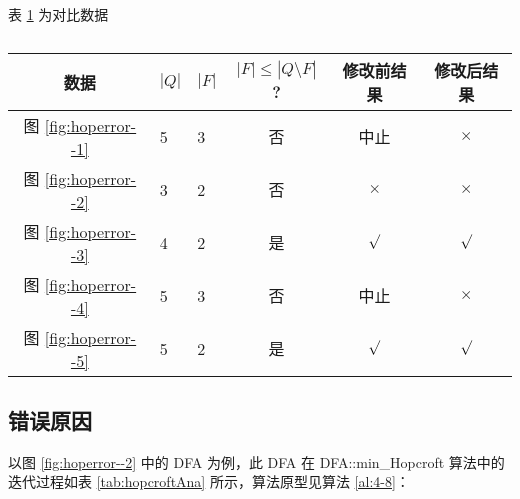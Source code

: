   表 \ref{tab:KeepMinResultofAll-hop} 为对比数据

  \begin{table}[!htbp]
    \caption{  }
    \label{tab:KeepMinResultofAll-hop}
    \centering
    \small%
    \setlength{\tabcolsep}{4pt}%
    \renewcommand{\arraystretch}{1.2}%
    \begin{tabular}{c p{2em}<{\centering}p{2em}<{\centering}ccc }  %
        \toprule %
        数据 & $|Q|$ & $|F|$ & $|F|\leq |Q \setminus F|$? & 修改前结果 &  修改后结果  \\
        \midrule
        图 \ref{fig:hoperror--1}        & 5 & 3 & 否 & 中止       & $\times$        \\
        图 \ref{fig:hoperror--2}        & 3 & 2 & 否 & $\times$   & $\times$       \\
        图 \ref{fig:hoperror--3}        & 4 & 2 & 是 & $\surd$    & $\surd$       \\
        图 \ref{fig:hoperror--4}        & 5 & 3 & 否 & 中止       & $\times$       \\
        图 \ref{fig:hoperror--5}        & 5 & 2 & 是 & $\surd$    & $\surd$       \\
        \bottomrule%
    \end{tabular}
\end{table}

\subsection{错误原因}\label{sec:reason-hopcroft}

以图 \ref{fig:hoperror--2} 中的 DFA 为例，此 DFA 在 DFA::min\_Hopcroft 算法中的迭代过程如表 \ref{tab:hopcroftAna} 所示，算法原型见算法 \ref{al:4-8}：

